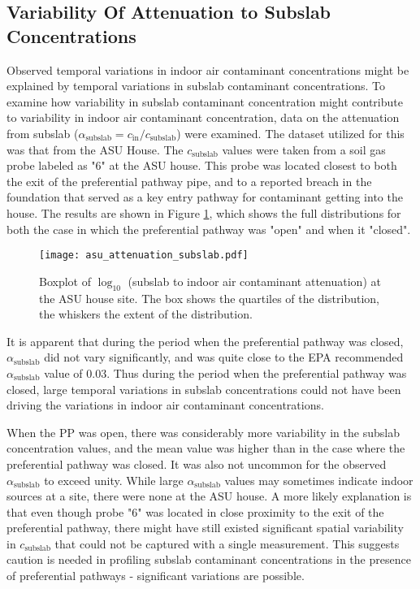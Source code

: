 \subsection{Variability Of Attenuation to Subslab Concentrations}\label{s:results_attenuation}

Observed temporal variations in indoor air contaminant concentrations might be explained by temporal variations in subslab contaminant concentrations.
To examine how variability in subslab contaminant concentration might contribute to variability in indoor air contaminant concentration, data on the attenuation from subslab ($\alpha_\mathrm{subslab} = c_\mathrm{in}/c_\mathrm{subslab}$) were examined.
The dataset utilized for this was that from the ASU House.
The $c_\mathrm{subslab}$ values were taken from a soil gas probe labeled as "6" at the ASU house.
This probe was located closest to both the exit of the preferential pathway pipe, and to a reported breach in the foundation that served as a key entry pathway for contaminant getting into the house\cite{guo_identification_2015}.
The results are shown in Figure \ref{fig:attenuation_subslab}, which shows the full distributions for both the case in which the preferential pathway was "open" and when it "closed".\par

\begin{figure}[htb!]
  \centering
 \texttt{[image: asu\_attenuation\_subslab.pdf]}
 \caption{Boxplot of $\log_{10}$ (subslab to indoor air contaminant attenuation) at the ASU house site. The box shows the quartiles of the distribution, the whiskers the extent of the distribution.}\label{fig:attenuation_subslab}
\end{figure}

It is apparent that during the period when the preferential pathway was closed, $\alpha_\mathrm{subslab}$ did not vary significantly, and was quite close to the EPA recommended $\alpha_\mathrm{subslab}$ value of 0.03\cite{u.s._environmental_protection_agency_oswer_2015}.
Thus during the period when the preferential pathway was closed, large temporal variations in subslab concentrations could not have been driving the variations in indoor air contaminant concentrations.\par

When the PP was open, there was considerably more variability in the subslab concentration values, and the mean value was higher than in the case where the preferential pathway was closed.
It was also not uncommon for the observed $\alpha_\mathrm{subslab}$ to exceed unity.
While large $\alpha_\mathrm{subslab}$ values may sometimes indicate indoor sources at a site, there were none at the ASU house.
A more likely explanation is that even though probe "6" was located in close proximity to the exit of the preferential pathway, there might have still existed significant spatial variability in $c_\mathrm{subslab}$ that could not be captured with a single measurement.
This suggests caution is needed in profiling subslab contaminant concentrations in the presence of preferential pathways - significant variations are possible.\par

